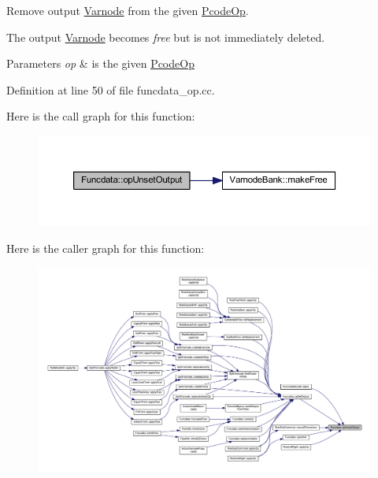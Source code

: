 Remove output \mbox{\hyperlink{class_varnode}{Varnode}} from the given \mbox{\hyperlink{class_pcode_op}{Pcode\+Op}}. 

The output \mbox{\hyperlink{class_varnode}{Varnode}} becomes {\itshape free} but is not immediately deleted. 
\begin{DoxyParams}{Parameters}
{\em op} & is the given \mbox{\hyperlink{class_pcode_op}{Pcode\+Op}} \\
\hline
\end{DoxyParams}


Definition at line 50 of file funcdata\+\_\+op.\+cc.

Here is the call graph for this function\+:
\nopagebreak
\begin{figure}[H]
\begin{center}
\leavevmode
\includegraphics[width=350pt]{class_funcdata_ab91b54da6501e12d4ad1e81ab5d0e5c4_cgraph}
\end{center}
\end{figure}
Here is the caller graph for this function\+:
\nopagebreak
\begin{figure}[H]
\begin{center}
\leavevmode
\includegraphics[width=350pt]{class_funcdata_ab91b54da6501e12d4ad1e81ab5d0e5c4_icgraph}
\end{center}
\end{figure}
\mbox{\label{class_funcdata_aafb83719ca201b5d57283058e2bcadee}} 
